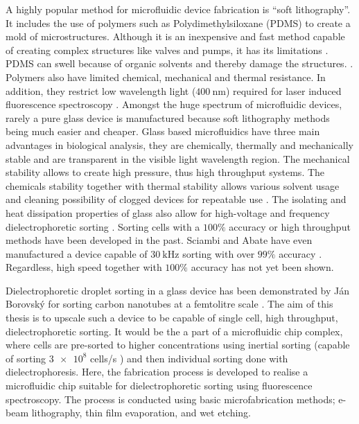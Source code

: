 \documentclass[final]{jyflluk}
\begin{document}
A highly popular method for microfluidic device fabrication is “soft lithography”. It includes the use of polymers such as Polydimethylsiloxane (PDMS) to create a mold of microstructures. Although it is an inexpensive and fast method capable of creating complex structures like valves and pumps, it has its limitations \cite{xia_soft_1998,tian2008introduction, pethig_review_2010, grover_monolithic_2003}. PDMS can swell because of organic solvents and thereby damage the structures. \cite{lee_solvent_2003}. Polymers also have limited chemical, mechanical and thermal resistance. In addition, they restrict low wavelength light ($\SI{400}{\nano \metre}$) required for laser induced fluorescence spectroscopy \cite{tian2008introduction,stankova_optical_2016}. Amongst the huge spectrum of microfluidic devices, rarely a pure glass device is manufactured because soft lithography methods being much easier and cheaper. Glass based microfluidics have three main advantages in biological analysis, they are chemically, thermally and mechanically stable and are transparent in the visible light wavelength region. The mechanical stability allows to create high pressure, thus high throughput systems. The chemicals stability together with thermal stability allows various solvent usage and cleaning possibility of clogged devices for repeatable use \cite{ofner_high-throughput_2017}. The isolating and heat dissipation properties of glass also allow for high-voltage and frequency dielectrophoretic sorting \cite{effenhauser_high-speed_1994}.
Sorting cells with a $100 \percent$ accuracy \cite{takahashi_non-destructive_2004, thomas_imagebased_2019} or high throughput methods \cite{zhang_towards_2015} have been developed in the past. Sciambi and Abate have even manufactured a device capable of $\SI{30}{\kilo \Hz}$ sorting with over $99 \percent$ accuracy \cite{sciambi2015accurate}. Regardless, high speed together with $100\percent$ accuracy has not yet been shown.

Dielectrophoretic droplet sorting in a glass device has been demonstrated by Ján Borovský for sorting carbon nanotubes at a femtolitre scale \cite{borovsky}. The aim of this thesis is to upscale such a device to be capable of single cell, high throughput, dielectrophoretic sorting. It would be the a part of a microfluidic chip complex, where cells are pre-sorted to higher concentrations using inertial sorting (capable of sorting $\num{3e8}$ cells/s \cite{edd_microfluidic_2020}) and then individual sorting done with dielectrophoresis. Here, the fabrication process  is developed to realise a microfluidic chip suitable for dielectrophoretic sorting using fluorescence spectroscopy. The process is conducted using basic microfabrication methods; e-beam lithography, thin film evaporation, and wet etching.
\end{document}
